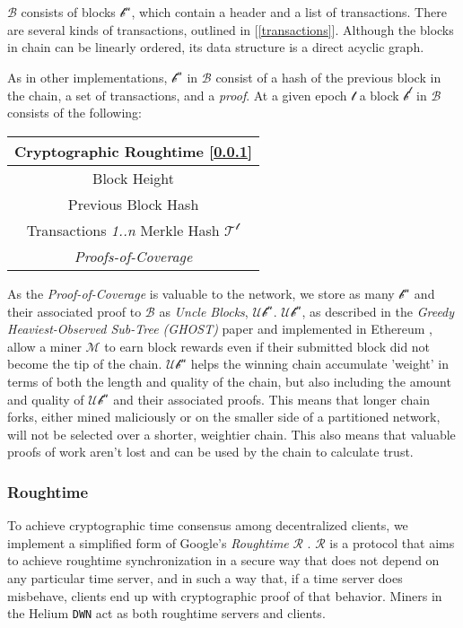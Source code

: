 \documentclass[letterpaper,11pt]{article}
\begin{document}
$\mathcal{B}$ consists of blocks $\mathcal{b^n}$, which contain a header and a list of transactions. There are several kinds of transactions, outlined in [\ref{transactions}]. Although the blocks in chain can be linearly ordered, its data structure is a direct acyclic graph.\newline

As in other implementations, $\mathcal{b^n}$ in $\mathcal{B}$ consist of a hash of the previous block in the chain, a set of transactions, and a \textit{proof}. At a given epoch $\mathcal{t}$ a block $\mathcal{b^t}$ in $\mathcal{B}$ consists of the following:

\begin{center}
	\begin{tabular}{|c|}
		\hline
		 Cryptographic Roughtime [\ref{roughtime}]\\
		 \hline
		 Block Height \\
		\hline
		 Previous Block Hash \\
		 \hline
		 Transactions \textit{1..n} Merkle Hash $\mathcal{T^t}$ \\
		 \hline
		 \textit{Proofs-of-Coverage} \\
		 \hline
	\end{tabular}
\end{center}

As the \textit{Proof-of-Coverage} is valuable to the network, we store as many $\mathcal{b^n}$ and their associated proof to $\mathcal{B}$ as \textit{Uncle Blocks}, $\mathcal{Ub^n}$. $\mathcal{Ub^n}$, as described in the \textit{Greedy Heaviest-Observed Sub-Tree (GHOST)} \cite{ghost} paper and implemented in Ethereum \cite{ethereum}, allow a miner $\mathcal{M}$ to earn block rewards even if their submitted block did not become the tip of the chain. $\mathcal{Ub^n}$ helps the winning chain accumulate 'weight' in terms of both the length and quality of the chain, but also including the amount and quality of $\mathcal{Ub^n}$ and their associated proofs. This means that longer chain forks, either mined maliciously or on the smaller side of a partitioned network, will not be selected over a shorter, weightier chain. This also means that valuable proofs of work aren't lost and can be used by the chain to calculate trust.

\subsubsection{Roughtime} \label{roughtime}

To achieve cryptographic time consensus among decentralized clients, we implement a simplified form of Google's \textit{Roughtime} $\mathcal{R}$ \cite{roughtime}. $\mathcal{R}$ is a protocol that aims to achieve roughtime synchronization in a secure way that does not depend on any particular time server, and in such a way that, if a time server does misbehave, clients end up with cryptographic proof of that behavior. Miners in the Helium \verb|DWN| act as both roughtime servers and clients.\newline
\end{document}
